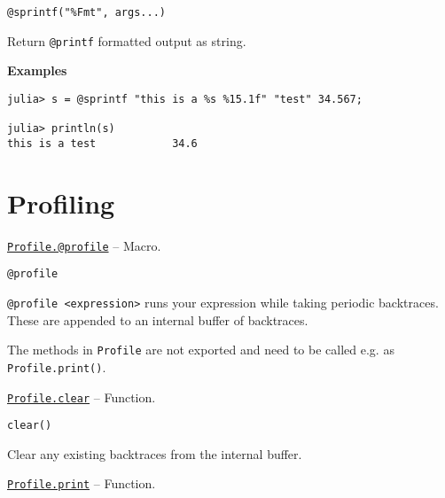 \begin{adjustwidth}{2em}{0pt}


\begin{verbatim}
@sprintf("%Fmt", args...)
\end{verbatim}

Return \texttt{@printf} formatted output as string.

\textbf{Examples}


\begin{verbatim}
julia> s = @sprintf "this is a %s %15.1f" "test" 34.567;

julia> println(s)
this is a test            34.6
\end{verbatim}



\end{adjustwidth}

\hypertarget{13446659783021526147}{}


\chapter{Profiling}


\hypertarget{9691715859147716436}{} 
\hyperlink{9691715859147716436}{\texttt{Profile.@profile}}  -- {Macro.}

\begin{adjustwidth}{2em}{0pt}


\begin{verbatim}
@profile
\end{verbatim}

\texttt{@profile <expression>} runs your expression while taking periodic backtraces. These are appended to an internal buffer of backtraces.



\end{adjustwidth}

The methods in \texttt{Profile} are not exported and need to be called e.g. as \texttt{Profile.print()}.


\hypertarget{15414823368700214048}{} 
\hyperlink{15414823368700214048}{\texttt{Profile.clear}}  -- {Function.}

\begin{adjustwidth}{2em}{0pt}


\begin{verbatim}
clear()
\end{verbatim}

Clear any existing backtraces from the internal buffer.



\end{adjustwidth}
\hypertarget{2955792207246042270}{} 
\hyperlink{2955792207246042270}{\texttt{Profile.print}}  -- {Function.}

